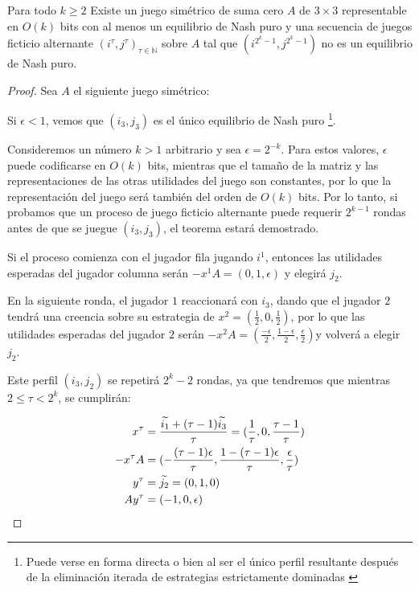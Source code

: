 \begin{theorem} \label{teorema:afp:velocidad:simetricos}
    Para todo $k \geq 2$ Existe un juego simétrico de suma cero $A$ de $3 \times 3$ representable en $O(k)$ bits con al menos un equilibrio de Nash puro y una secuencia de juegos ficticio alternante $(i^\tau, j^\tau)_{\tau \in \mathbb{N}}$ sobre $A$ tal que $(i^{2^k-1}, j^{2^k-1})$ no es un equilibrio de Nash puro.
\end{theorem}
\begin{proof}
    Sea $A$ el siguiente juego simétrico:

    

    Si $\epsilon < 1$, vemos que $(i_3, j_3)$ es el único equilibrio de Nash puro   \footnote{Puede verse en forma directa o bien al ser el único perfil resultante después de la eliminación iterada de estrategias estrictamente dominadas \cite{libro:rubinstein}}.

    Consideremos un número $k > 1$ arbitrario y sea $\epsilon = 2^{-k}$. Para estos valores, $\epsilon$ puede codificarse en $O(k)$ bits, mientras que el tamaño de la matriz y las representaciones de las otras utilidades del juego son constantes, por lo que la representación del juego será también del orden de  $O(k)$ bits. Por lo tanto, si probamos que un proceso de juego ficticio alternante puede requerir $2^{k-1}$ rondas antes de que se juegue $(i_3, j_3)$, el teorema estará demostrado.

    Si el proceso comienza con el jugador fila jugando $i^1$, entonces las utilidades esperadas del jugador columna serán $-x^1A = (0, 1, \epsilon)$ y elegirá $j_2$.

    En la siguiente ronda, el jugador $1$ reaccionará con $i_3$, dando que el jugador $2$ tendrá una creencia sobre su estrategia de $x^2 = (\frac{1}{2},0,\frac{1}{2})$, por lo que las utilidades esperadas del jugador $2$ serán $-x^2A = (\frac{-\epsilon}{2}, \frac{1-\epsilon}{2}, \frac{\epsilon}{2})$y volverá a elegir $j_2$.

    Este perfil $(i_3, j_2)$ se repetirá $2^k - 2$ rondas, ya que tendremos que mientras $2 \le \tau < 2^k$, se cumplirán:

    \begin{align*}
        x^\tau     &= \frac{\widetilde{i_1} + (\tau - 1) \widetilde{i_3}}{\tau} = (\frac{1}{\tau}, 0,\frac{\tau - 1}{\tau}) \\
        -x^{\tau}A &= (-\frac{(\tau-1) \epsilon}{\tau}, \frac{1-(\tau-1)\epsilon}{\tau}, \frac{\epsilon}{\tau}) \\
        y^\tau     &= \widetilde{j_2} = (0, 1, 0) \\
        Ay^\tau    &= (- 1, 0, \epsilon) \\
    \end{align*}


\end{proof}

